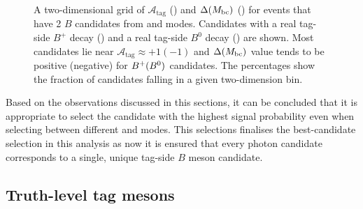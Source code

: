 \begin{figure}[htbp!]
    \centering
    \caption{\label{fig:selecting_tag_mode} A two-dimensional grid of $\mathcal{A}_{\mathrm{tag}}$ ()
    and $\Delta({M_{\mathrm{bc}}})$ () for events that have 2 $B$ candidates from \feiBp and \feiBz modes.
    Candidates with a real tag-side $B^+$ decay ()
    and a real tag-side $B^0$ decay () are shown.
    Most candidates lie near $\mathcal{A}_{\mathrm{tag}}\approx +1 (-1)$ and
    $\Delta({M_{\mathrm{bc}}})$ value tends to be positive (negative) for $B^+(B^0)$ candidates.
    The percentages show the fraction of candidates falling in a given two-dimension bin.
    }
\end{figure}

Based on the observations discussed in this sections, it can be concluded that it is appropriate to select the \FEI candidate with the highest signal probability even when selecting between different \feiBp and \feiBz modes.
This selections finalises the best-candidate selection in this analysis as now it is ensured that every photon candidate corresponds to a single, unique tag-side $B$ meson candidate.

\subsection{Truth-level tag \texorpdfstring{\B}{B} mesons}\label{sec:good_tag_definition}

